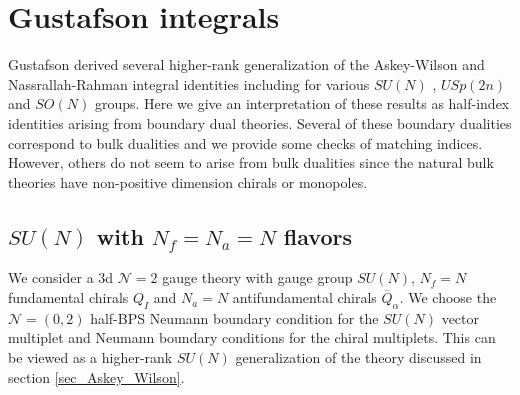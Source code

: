 \documentclass[12pt]{article}
\numberwithin{equation}{section}
\begin{document}
\section{Gustafson integrals}
\label{sec_G_integrals}
Gustafson derived several higher-rank generalization of the Askey-Wilson and Nassrallah-Rahman integral identities including for various $SU(N)$ \cite{MR1139492, MR1266569}, $USp(2n)$ \cite{MR1139492, MR1147876, MR1266569} and $SO(N)$ \cite{MR1139492} groups. Here we give an interpretation of these results as half-index identities arising from boundary dual theories. Several of these boundary dualities correspond to bulk dualities and we provide some checks of matching indices. However, others do not seem to arise from bulk dualities since the natural bulk theories have non-positive dimension chirals or monopoles.

\subsection{$SU(N)$ with $N_f = N_a = N$ flavors}
\label{sec_GAW_SUN_integrals}
We consider a 3d $\mathcal{N}=2$ gauge theory with gauge group $SU(N)$, 
$N_f=N$ fundamental chirals $Q_{I}$ and $N_a=N$ antifundamental chirals $\overline{Q}_{\alpha}$. 
We choose the $\mathcal{N}=(0,2)$ half-BPS Neumann boundary condition for the $SU(N)$ vector multiplet 
and Neumann boundary conditions for the chiral multiplets. 
This can be viewed as a higher-rank $SU(N)$ generalization of the theory discussed in section \ref{sec_Askey_Wilson}. 
\end{document}
